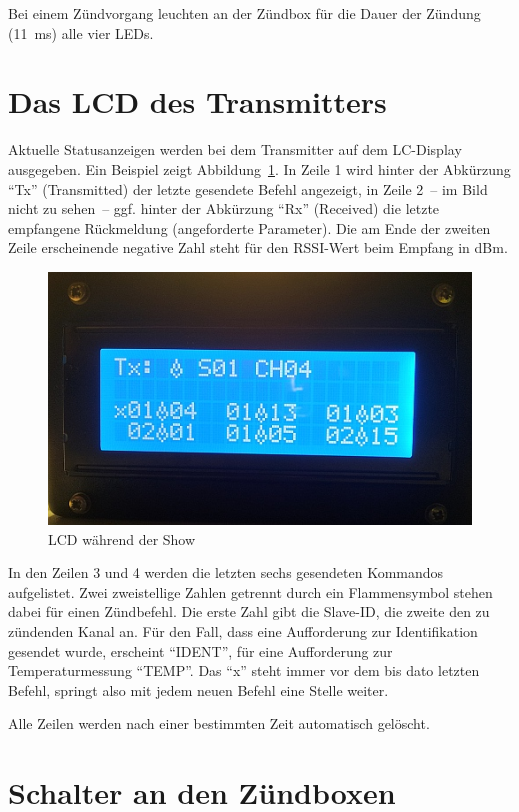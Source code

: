 \documentclass[paper=a4, parskip, numbers=noenddot, toc=listof, headsepline]{scrbook}
\begin{document}
			Bei einem Zündvorgang leuchten an der Zündbox für die Dauer der Zündung (\SI{11}{\milli\second}) alle vier LEDs.

		\section{Das LCD des Transmitters}

			Aktuelle Statusanzeigen werden bei dem Transmitter auf dem LC-Display ausgegeben. Ein Beispiel zeigt Abbildung~\ref{fig:senderanzeige}. In Zeile 1 wird hinter der Abkürzung \enquote{Tx} (Transmitted) der letzte gesendete Befehl angezeigt, in Zeile 2~-- im Bild nicht zu sehen~-- ggf. hinter der Abkürzung \enquote{Rx} (Received) die letzte empfangene Rückmeldung (angeforderte Parameter). Die am Ende der zweiten Zeile erscheinende negative Zahl steht für den RSSI-Wert beim Empfang in dBm.

			\begin{figure}
				\centering
				\includegraphics[width=.7\textwidth]{Bilder/SenderAnzeige}
				\caption{LCD während der Show}
				\label{fig:senderanzeige}
			\end{figure}

			In den Zeilen 3 und 4 werden die letzten sechs gesendeten Kommandos aufgelistet. Zwei zweistellige Zahlen getrennt durch ein Flammensymbol stehen dabei für einen Zündbefehl. Die erste Zahl gibt die Slave-ID, die zweite den zu zündenden Kanal an. Für den Fall, dass eine Aufforderung zur Identifikation gesendet wurde, erscheint \enquote{IDENT}, für eine Aufforderung zur Temperaturmessung \enquote{TEMP}. Das \enquote{x} steht immer vor dem bis dato letzten Befehl, springt also mit jedem neuen Befehl eine Stelle weiter.

			Alle Zeilen werden nach einer bestimmten Zeit automatisch gelöscht.

		\section{Schalter an den Zündboxen}
\end{document}
